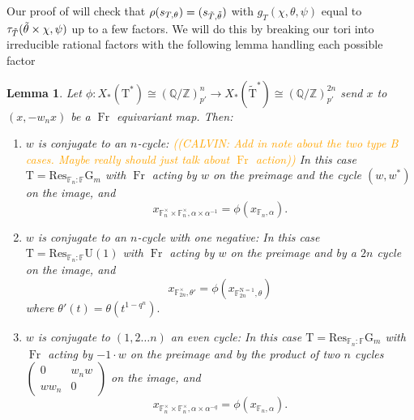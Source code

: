 \documentclass[12pt, reqno]{amsart}
\newtheorem{lemma}[theorem]{Lemma}
\theoremstyle{definition}
\theoremstyle{definition}
\theoremstyle{definition}
\newcommand{\GL}{\mathrm{GL}}
\newcommand{\aFieldNorm}{\mathrm{N}}
\newcommand{\finiteField}{\mathbb{F}}
\newcommand{\finiteFieldExtension}[1]{\finiteField_{#1}}
\newcommand{\NormOneGroup}[1]{\finiteFieldExtension{#1}^{\aFieldNorm = 1}}
\newcommand{\Frobenius}{\operatorname{Fr}}
\newcommand{\algebraicGroup}[1]{\boldsymbol{\mathrm{#1}}}
\newcommand{\calvin}[1]{\textcolor{orange}{\sffamily ((CALVIN: #1))}}
\begin{document}
Our proof of  will check that $\rho(s_{T,\theta}) = (s_{\Tilde{T},\Tilde{\theta}})$ with $g_{T}(\chi,\theta,\psi)$ equal to $\tau_{\Tilde{T}}(\Tilde{\theta} \times \chi,\psi)$ up to a few factors. We will do this by breaking our tori into irreducible rational factors with the following lemma handling each possible factor

\begin{lemma}
\label{lem:cochar_computation}
    Let $\phi:X_*(\algebraicGroup{T}^*) \cong (\mathbb{Q}/\mathbb{Z})_{p'}^n \to X_*(\tilde{\algebraicGroup{T}}^*) \cong (\mathbb{Q}/\mathbb{Z})_{p'}^{2n}$ send $x$ to $(x,-w_n x)$ be a $\Frobenius$ equivariant map. Then:
    \begin{enumerate}
        \item[B,C,D Case 1)] $w$ is conjugate to an $n$-cycle: \calvin{Add in note about the two type B cases. Maybe really should just talk about $\Frobenius$ action} In this case $\algebraicGroup{T} = \mathrm{Res}_{\mathbb{F}_n:\mathbb{F}}\algebraicGroup{G}_m$ with $\Frobenius$ acting by $w$ on the preimage and the cycle $(w,w^\ast)$ on the image, and $$x_{\finiteFieldExtension{n}^\times \times \finiteFieldExtension{n}^\times,\alpha \times \alpha^{-1}} = \phi(x_{\finiteFieldExtension{n},\alpha}).$$
        \item[B,C,D Case 2)] $w$ is conjugate to an $n$-cycle with one negative:
 In this case $\algebraicGroup{T} = \mathrm{Res}_{\mathbb{F}_n:\mathbb{F}}\algebraicGroup{U}(1)$ with $\Frobenius$ acting by $w$ on the preimage and by a $2n$ cycle on the image, and $$x_{\finiteField_{2n}^\times,\theta'}=\phi(x_{\NormOneGroup{2n},\theta})$$ where $\theta'(t) = \theta(t^{1-q^n}).$
    \item[$G=\algebraicGroup{U}$ Case 1)] $w$ is conjugate to $(1,2 \hdots n)$ an even cycle: In this case $\algebraicGroup{T} = \mathrm{Res}_{\mathbb{F}_n:\mathbb{F}}\algebraicGroup{G}_m$ with $\Frobenius$ acting by $-1\cdot w$ on the preimage and by the product of two $n$ cycles $\begin{pmatrix} 0 & w_nw \\
        w w_n & 0
        \end{pmatrix}$  on the image, and 
		$$x_{\finiteFieldExtension{n}^\times \times \finiteFieldExtension{n}^\times,\alpha \times \alpha^{-q}} = \phi(x_{\finiteFieldExtension{n},\alpha}).$$

\end{enumerate}
\end{lemma}
\end{document}
